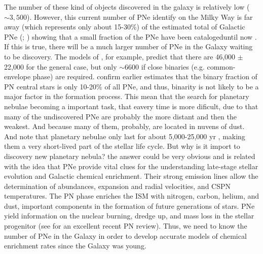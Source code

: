 \documentclass[fleqn,usenatbib]{mnras}
\begin{document}
The number of these kind of objects discovered in the galaxy is relatively low (\(\sim 3,500\)).
However, this current number of PNe identify on the Milky Way is far away (which represents
only about 15-30\%) of the estimated total of Galactic PNe (\citealp{Frew:2008}; \citealp{Jacoby:2010})
showing that a small fraction of the PNe have been catalogeduntil now \citep{Frew:2017}.
If this is true, there will be a much larger number of PNe in the Galaxy waiting to be discovery.
The models of \citet{Moe:2006}, for example, predict that there are 46,000 $\pm$ 22,000
for the general case, but only $\sim$6600 \citep{Marco:2005} if close binaries
(e.g. common-envelope phase) are required. \citet{Miszalski:2009} confirm earlier estimates
that the binary fraction of PN central stars is only 10-20\% of all
PNe, and thus, binarity is not likely to be a major factor in
the formation process. This mean that the search for planetary nebulae
becoming a important task, that eavery time is more dificult, due to that many of
the undiscovered PNe are probably the more distant and then the weakest.
And because many of them, probably, are located in nuvens of dust.
And note that planetary nebulae only last for about 5,000-25,000 yr \citep{Badenes:2015},
making them a very short-lived part of the stellar life cycle.
But why is it import to discovery new planetary nebula? the answer could be very obvious and is
related with the idea that PNe provide vital clues for the understanding late-stage stellar
evolution and Galactic chemical enrichment. Their strong emission lines
allow the determination of abundances, expansion and radial velocities, and
CSPN temperatures. The PN phase enriches the ISM with nitrogen, carbon, helium,
and dust, important components in the formation of future
generations of stars. PNe yield information on the nuclear
burning, dredge up, and mass loss in the stellar progenitor
(see \citealp{Kwitter:2022} for an excellent recent PN
review). Thus, we need to know the number of PNe in
the Galaxy in order to develop accurate models of 
chemical enrichment rates since the Galaxy was young.
\end{document}
